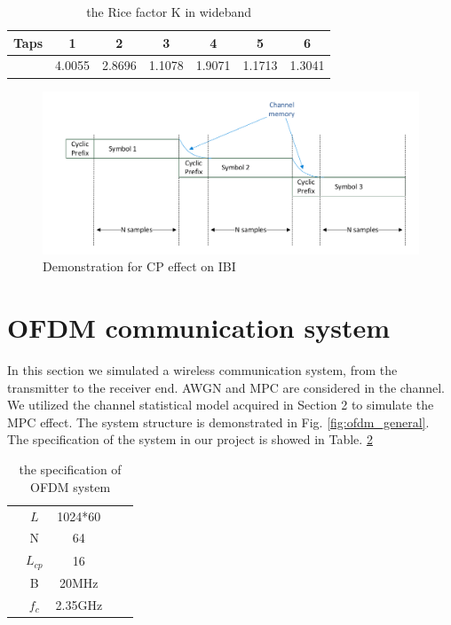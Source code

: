\documentclass[a4paper]{article}
\begin{document}
     \begin{table}[h]
		\centering 
		\begin{tabular}{lcccccc}
			\hline
			Taps &1 &2 &3 &4 &5 &6 \\
			\hline 
			\centering{ $K$}  &4.0055 &2.8696 &1.1078 &1.9071 &1.1713 &1.3041 \\ 
			\hline 
		\end{tabular}
		\caption{the Rice factor K in wideband}
		\label{tb:kforwb}
	\end{table}
    
    \begin{figure}
		\centering
		\includegraphics[scale=0.45]{figures/ibi_show.png}
		\vspace{-0.2cm}
		\centering
		\caption{Demonstration for CP effect on IBI}
		\label{fig:cpIBI}
	\end{figure} 
	
	\section{OFDM communication system}
	
	In this section we simulated a wireless communication system, from the transmitter to the receiver end. AWGN and MPC are considered in the channel. We utilized the channel statistical model acquired in Section 2 to simulate the MPC effect. The system structure is demonstrated in Fig. \ref{fig:ofdm_general}. The specification of the system in our project is showed in Table. \ref{tb:spec in system}
    
     \begin{table}[h]
		\centering 
		\begin{tabular}{lcccc}
			\hline	
            	\centering{ Length of signal}  &$L$ &1024*60 \\ 
			
			\centering{ Numer of subcarriers}  &N &64 \\ 
			 
			\centering{ CP Length}  &$L_{cp}$ &16 \\ 
		
            	\centering{ Bandwidth}  &B &20MHz \\ 
			 
            	\centering{ Carrier frquency}  &$f_c$ &2.35GHz\\ 
			\hline      
		\end{tabular}
		\caption{the specification  of OFDM system}
		\label{tb:spec in system}
	\end{table}
	
\end{document}
